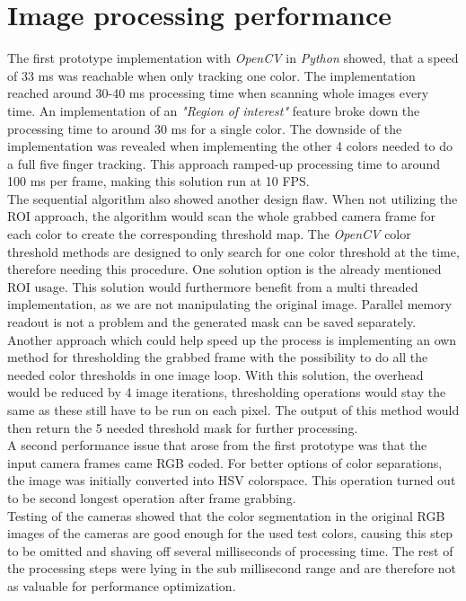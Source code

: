 \section{Image processing performance}
The first prototype implementation with \textit{OpenCV} in \textit{Python} showed, that a speed of  33 ms was reachable when only tracking one color. The implementation reached around 30-40 ms processing time when scanning whole images every time. An implementation of an \textit{"Region of interest"} feature  broke down the processing time to around 30 ms for a single color. The downside of the implementation was revealed when implementing the other 4 colors needed to do a full five finger tracking. This approach ramped-up processing time to around 100 ms per frame, making this solution run at 10 FPS.\\ 
The sequential algorithm also showed another design flaw. When not utilizing the ROI approach, the algorithm would scan the whole grabbed camera frame for each color to create the corresponding threshold map. The \textit{OpenCV} color threshold methods are designed to only search for one color threshold at the time, therefore needing this procedure. One solution option is the already mentioned ROI usage. This solution would furthermore benefit from a multi threaded implementation, as we are not manipulating the original image. Parallel memory readout is not a problem and the generated mask can be saved separately.\\
Another approach which could help speed up the process is implementing an own method for thresholding the grabbed frame with the possibility to do all the needed color thresholds in one image loop. With this solution, the overhead would be reduced by 4 image iterations, thresholding operations would stay the same as these still have to be run on each pixel. The output of this method would then return the 5 needed threshold mask for further processing.\\
A second performance issue that arose from the first prototype was that the input camera frames came RGB coded. For better options of color separations, the image was initially converted into HSV colorspace. This operation turned out to be second longest operation after frame grabbing. \\Testing of the cameras showed that the color segmentation in the original RGB images of the cameras are good enough for the used test colors, causing this step to be omitted and shaving off several milliseconds of processing time.
The rest of the processing steps were lying in the sub millisecond range and are therefore not as valuable for performance optimization.
